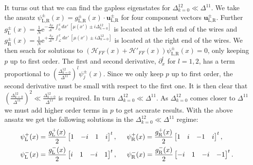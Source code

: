 It turns out that we can find the gapless eigenstates for $\Delta^{12}_{k=0} \ll \Delta^{11}$. We take the ansatz $\psi_{\text{L,R}}^{\pm}(x) = g_{\text{L,R}}^{\pm}(x)\cdot \mathbf{u}^{\pm}_{\text{L,R}}$ for four component vectors $\mathbf{u}^{\pm}_{\text{L,R}}$. Further $g_{\text{L}}^{\pm}(x) = \frac{1}{N}\text{e}^{-\frac{k_F}{\Delta^{11}}\int_0^x dx' \; \left[\mu(x') \pm i\Delta^{12}_{k=0}\right] }$ is located at the left end of the wires and $g_{\text{R}}^{\pm}(x) = \frac{1}{N}\text{e}^{+\frac{k_F}{\Delta^{11}}\int_{\mathcal{L}}^x dx' \; \left[\mu(x') \pm i\Delta^{12}_{k=0}\right] }$ is located at the right end of the wires. We then seach for solutions to $(\mathcal{H}_{FF}(x) + \mathcal{H}'_{FF}(x))\psi_{\text{L,R}}^{\pm}(x) = 0$, only keeping $p$ up to first order. The first and second derivative, $\partial^l_x$ for $l = 1, 2$, has a term proportional to $\left(\frac{\Delta^{12}_{k=0}}{\Delta^{11}}\right)^l\psi_j^{\pm}(x)$. Since we only keep $p$ up to first order, the second derivative must be small with respect to the first one. It is then clear that $\left(\frac{\Delta^{12}_{k=0}}{\Delta^{11}}\right)^2 \ll \frac{\Delta^{12}_{k=0}}{\Delta^{11}}$ is required. In turn $\Delta^{12}_{k=0} \ll \Delta^{11}$. As $\Delta^{12}_{k=0}$ comes closer to $\Delta^{11}$ we must add higher order terms in $p$ to get accurate results. With the above ansatz we get the following solutions in the $\Delta^{12}_{k=0} \ll \Delta^{11}$ regime:
\begin{align}
\psi_{\text{L}}^{+}(x) &= \frac{g_{\text{L}}^{+}(x)}{2}\begin{bmatrix} 1 & -i & 1 & i \end{bmatrix}^t, \hspace{0.5cm} \psi_{\text{R}}^{+}(x) = \frac{g_{\text{R}}^{+}(x)}{2}\begin{bmatrix} 1 & i & -1 & i \end{bmatrix}^t, \nonumber \\
\psi_{\text{L}}^{-}(x) &= \frac{g_{\text{L}}^{-}(x)}{2}\begin{bmatrix} i & 1 & -i & 1 \end{bmatrix}^t, \hspace{0.5cm} \psi_{\text{R}}^{-}(x) = \frac{g_{\text{R}}^{-}(x)}{2}\begin{bmatrix} -i & 1 & -i & -1 \end{bmatrix}^t.
\label{eq.zeromodesDelta12real}
\end{align}
